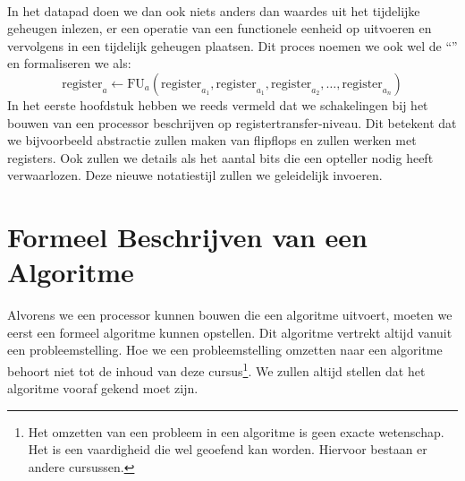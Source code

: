 \paragraph{}
In het datapad doen we dan ook niets anders dan waardes uit het tijdelijke geheugen inlezen, er een operatie van een functionele eenheid op uitvoeren en vervolgens in een tijdelijk geheugen plaatsen. Dit proces noemen we ook wel de ``'' en formaliseren we als:
\begin{equation}
\mbox{register}_a\leftarrow\mbox{FU}_a\left(\mbox{register}_{a_1},\mbox{register}_{a_1},\mbox{register}_{a_2},\ldots,\mbox{register}_{a_n}\right)
\end{equation}
In het eerste hoofdstuk hebben we reeds vermeld dat we schakelingen bij het bouwen van een processor beschrijven op registertransfer-niveau. Dit betekent dat we bijvoorbeeld abstractie zullen maken van flipflops en zullen werken met registers. Ook zullen we details als het aantal bits die een opteller nodig heeft verwaarlozen. Deze nieuwe notatiestijl zullen we geleidelijk invoeren.
\section{Formeel Beschrijven van een Algoritme}
\label{s:descriptionFSMD}
Alvorens we een processor kunnen bouwen die een algoritme uitvoert, moeten we eerst een formeel algoritme kunnen opstellen. Dit algoritme vertrekt altijd vanuit een probleemstelling. Hoe we een probleemstelling omzetten naar een algoritme behoort niet tot de inhoud van deze cursus\footnote{Het omzetten van een probleem in een algoritme is geen exacte wetenschap. Het is een vaardigheid die wel geoefend kan worden. Hiervoor bestaan er andere cursussen.}. We zullen altijd stellen dat het algoritme vooraf gekend moet zijn.
